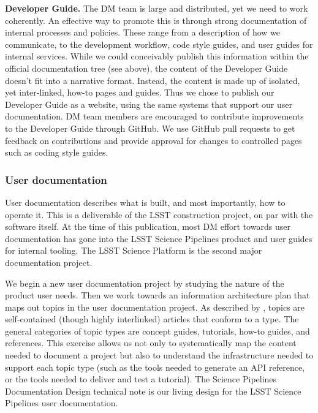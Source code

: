 \noindent \textbf{Developer Guide.}
The DM team is large and distributed, yet we need to work coherently.
An effective way to promote this is through strong documentation of internal processes and policies.
These range from a description of how we communicate, to the development workflow, code style guides, and user guides for internal services.
While we could conceivably publish this information within the official documentation tree (see above), the content of the Developer Guide doesn't fit into a narrative format.
Instead, the content is made up of isolated, yet inter-linked, how-to pages and guides.
Thus we chose to publish our Developer Guide as a website,\cite{devguide} using the same systems that support our user documentation.
DM team members are encouraged to contribute improvements to the Developer Guide through GitHub.
We use GitHub pull requests to get feedback on contributions and provide approval for changes to controlled pages such as coding style guides.

\subsubsection{User documentation}
\label{sec:user_docs}

User documentation describes what is built, and most importantly, how to operate it.
This is a deliverable of the LSST construction project, on par with the software itself.
At the time of this publication, most DM effort towards user documentation has gone into the LSST Science Pipelines product\cite{pipelines-guide} and user guides for internal tooling.
The LSST Science Platform\cite{LSE-319} is the second major documentation project.

We begin a new user documentation project by studying the nature of the product user needs.
Then we work towards an information architecture plan that maps out topics in the user documentation project.
As described by , topics are self-contained (though highly interlinked) articles that conform to a type.
The general categories of topic types are concept guides, tutorials, how-to guides, and references.\cite{Procida:2017}
This exercise allows us not only to systematically map the content needed to document a project but also to understand the infrastructure needed to support each topic type (such as the tools needed to generate an API reference, or the tools needed to deliver and test a tutorial).
The Science Pipelines Documentation Design\cite{DMTN-030} technical note is our living design for the LSST Science Pipelines user documentation.

